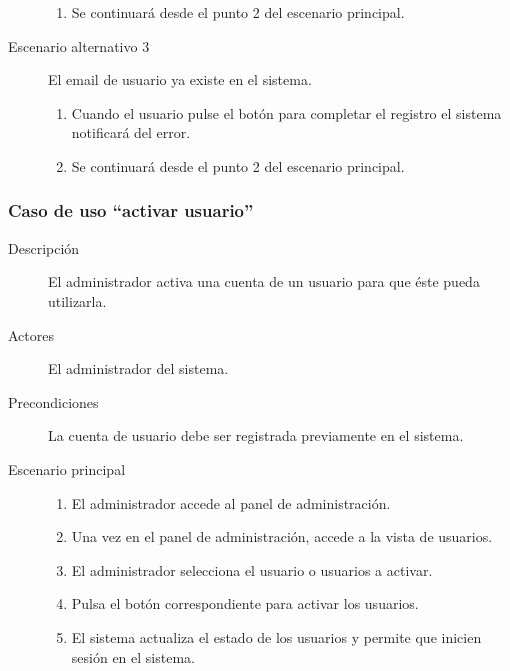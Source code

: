 \begin{description}
\begin{enumerate}
								\item Se continuará desde el punto 2 del escenario principal.
								\end{enumerate}
\item[Escenario alternativo 3]	El email de usuario ya existe en el sistema.
								\begin{enumerate}
								\item Cuando el usuario pulse el botón para completar el registro el sistema notificará del error.
								\item Se continuará desde el punto 2 del escenario principal.
								\end{enumerate}
\end{description}


\subsubsection{Caso de uso ``activar usuario''}
\begin{description}
\item[Descripción] 				El administrador activa una cuenta de un usuario para que éste pueda utilizarla.
\item[Actores]					El administrador del sistema.
\item[Precondiciones]			La cuenta de usuario debe ser registrada previamente en el sistema.
\item[Escenario principal]	 	\hfill
								\begin{enumerate}
								\item El administrador accede al panel de administración.
								\item Una vez en el panel de administración, accede a la vista de usuarios.
								\item El administrador selecciona el usuario o usuarios a activar.
								\item Pulsa el botón correspondiente para activar los usuarios.
								\item El sistema actualiza el estado de los usuarios y permite que inicien sesión en el sistema.
								\end{enumerate}
\end{description}


